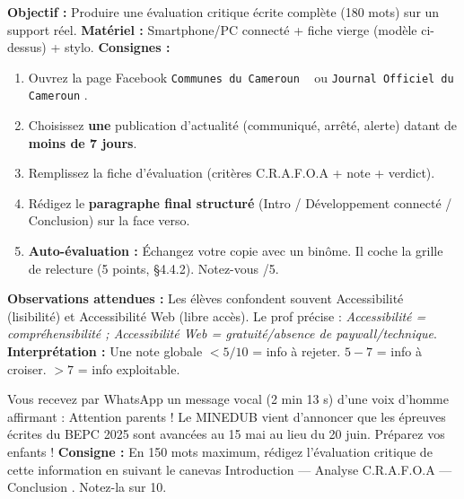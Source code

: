 \documentclass[11pt]{article}
\begin{document}
\begin{experience}
\textbf{Objectif :} Produire une évaluation critique écrite complète (180 mots) sur un support réel.
\textbf{Matériel :} Smartphone/PC connecté + fiche vierge (modèle ci-dessus) + stylo.
\textbf{Consignes :}
\begin{enumerate}
    \item Ouvrez la page Facebook \guillemotleft \texttt{Communes du Cameroun} \guillemotright~ ou \guillemotleft \texttt{Journal Officiel du Cameroun} \guillemotright.
    \item Choisissez \textbf{une} publication d'actualité (communiqué, arrêté, alerte) datant de \textbf{moins de 7 jours}.
    \item Remplissez la fiche d'évaluation (critères C.R.A.F.O.A + note + verdict).
    \item Rédigez le \textbf{paragraphe final structuré} (Intro / Développement connecté / Conclusion) sur la face verso.
    \item \textbf{Auto-évaluation :} Échangez votre copie avec un binôme. Il coche la grille de relecture (5 points, §4.4.2). Notez-vous /5.
\end{enumerate}
\textbf{Observations attendues :} Les élèves confondent souvent \guillemotleft Accessibilité \guillemotright (lisibilité) et \guillemotleft Accessibilité Web \guillemotright (libre accès). Le prof précise : \emph{Accessibilité = compréhensibilité ; Accessibilité Web = gratuité/absence de paywall/technique}.
\textbf{Interprétation :} Une note globale $< 5/10$ = info à rejeter. $5-7$ = info à croiser. $> 7$ = info exploitable.
\end{experience}

\begin{exercice}
Vous recevez par WhatsApp un message vocal (2 min 13 s) d'une voix d'homme affirmant : \guillemotleft Attention parents ! Le MINEDUB vient d'annoncer que les épreuves écrites du BEPC 2025 sont avancées au 15 mai au lieu du 20 juin. Préparez vos enfants ! \guillemotright
\textbf{Consigne :} En 150 mots maximum, rédigez l'évaluation critique de cette information en suivant le canevas \guillemotleft Introduction — Analyse C.R.A.F.O.A — Conclusion \guillemotright. Notez-la sur 10.
\end{exercice}
\end{document}
